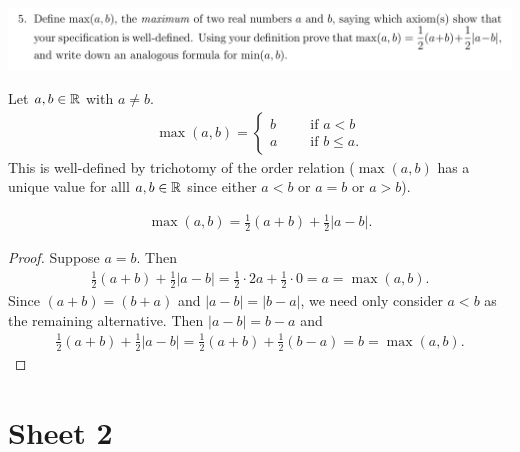 \documentclass[12pt]{article}
\begin{document}
\newpage
\subsection{}
\begin{mdframed}
  \includegraphics[width=400pt]{img/oxford-M2-analysis-I-1-5.png}
\end{mdframed}

\begin{definition*}
  Let $a, b \in \mathbb{R}$ with $a \neq b$.
  \begin{align*}
    \max(a, b) =
    \begin{cases}
      b ~~~~~~~&\text{if $a < b$}\\
      a ~~~~~~~&\text{if $b \leq a$}.
    \end{cases}
  \end{align*}
  This is well-defined by trichotomy of the order relation ($\max(a, b)$ has a unique value for
  alll $a, b \in \mathbb{R}$ since either $a < b$ or $a = b$ or $a > b$).
\end{definition*}

\begin{claim*}
  \begin{align*}
    \max(a, b) = \frac{1}{2}(a + b) + \frac{1}{2}|a - b|.
  \end{align*}
\end{claim*}

\begin{proof}
  Suppose $a = b$. Then
  \begin{align*}
    \frac{1}{2}(a + b) + \frac{1}{2}|a - b|
    = \frac{1}{2}\cdot 2a + \frac{1}{2}\cdot 0
    = a
    = \max(a, b).
  \end{align*}
  Since $(a + b) = (b + a)$ and $|a - b| = |b - a|$, we need only consider $a < b$ as the remaining
  alternative. Then $|a - b| = b - a$ and
  \begin{align*}
    \frac{1}{2}(a + b) + \frac{1}{2}|a - b|
    = \frac{1}{2}(a + b) + \frac{1}{2}(b - a)
    = b
    = \max(a, b).
  \end{align*}
\end{proof}

\newpage
\section{Sheet 2}
\end{document}
